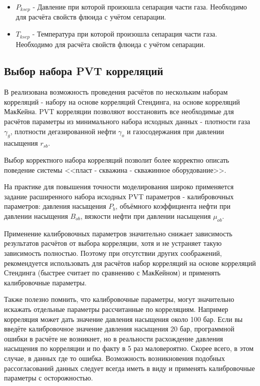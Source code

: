 \begin{itemize}
\item $P_{ksep}$ - Давление при которой произошла сепарация части газа. Необходимо для расчёта свойств флюида с учётом сепарации. 

\item $T_{ksep}$ - Температура при которой произошла сепарация части газа. Необходимо для расчёта свойств флюида с учётом сепарации. 

\end{itemize}

\subsection{Выбор набора PVT корреляций}
В \unf{} реализована возможность проведения расчётов по нескольким наборам корреляций - набору на основе корреляций Стендинга, на основе корреляций МакКейна. PVT корреляции позволяют восстановить все необходимые для расчётов параметры из минимального набора исходных данных - плотности газа $\gamma_g$, плотности дегазированной нефти $\gamma_o$ и газосодержания при давлении насыщения $r_{sb}$. 


Выбор корректного набора корреляций позволит более корректно описать поведение системы <<пласт - скважина - скважинное оборудование>>. 

На практике для повышения точности моделирования широко применяется задание расширенного набора исходных PVT параметров - калибровочных параметров: давления насыщения $P_b$, объёмного коэффициента нефти при давлении насыщения $B_{ob}$, вязкости нефти при давлении насыщения $\mu_{ob}$. 

Применение калибровочных параметров значительно снижает зависимость результатов расчётов от выбора корреляции, хотя и не устраняет такую зависимость полностью. Поэтому при отсутствии других соображений, рекомендуется использовать для расчётов набор корреляций на основе корреляций Стендинга (быстрее считает по сравнению с МакКейном) и применять калибровочные параметры.

Также полезно помнить, что калибровочные параметры, могут значительно искажать отдельные параметры рассчитанные по корреляциям. Например корреляция может дать значение давления насыщения около 100 бар. Если вы введёте калибровочное значение давления насыщения 20 бар, программной ошибки в расчёте не возникнет, но в реальности расхождение давления насыщения по корреляции и по факту в 5 раз маловероятно. Скорее всего, в этом случае, в данных где то ошибка. Возможность возникновения подобных рассогласований данных следует всегда иметь в виду и применять калибровочные параметры с осторожностью.  

